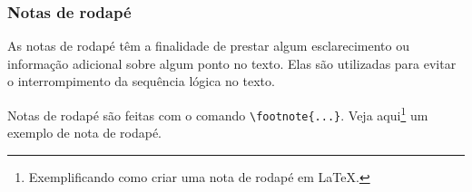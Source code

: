 \begin{frame}[fragile]
\frametitle{Notas de rodapé}
As notas de rodapé têm a finalidade de prestar algum esclarecimento ou informação adicional sobre
algum ponto no texto. Elas são utilizadas para evitar o interrompimento da sequência lógica no texto.

\vspace{2ex}
Notas de rodapé são feitas com o comando \verb|\footnote{...}|. 
Veja aqui\footnote{Exemplificando como criar uma nota de rodapé em \LaTeX{}.} um exemplo de nota de rodapé.
\end{frame}
